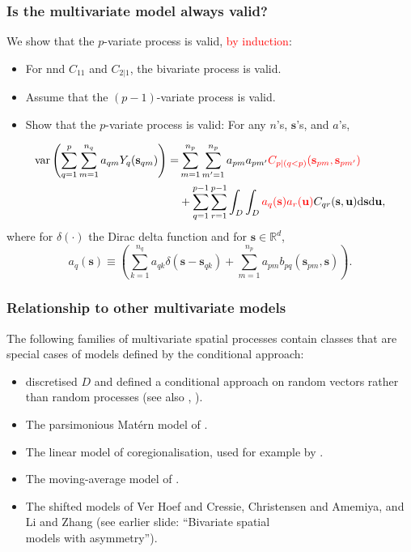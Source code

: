 \documentclass{beamer}
\newcommand{\intd} {\mathrm{d}}
\newcommand{\svec} {\textbf{s}}
\newcommand{\uvec} {\textbf{u}}
\newcommand{\s}{\mathbf{s}}
\newcommand{\var}{\mathrm{var}}
\newcommand{\red}{\textcolor{red}}%
\begin{document}

\begin{frame}
\frametitle{Is the multivariate model always valid?}

We show that the $p$-variate process is valid, \textcolor{red}{by induction}:
\begin{itemize}
  \item For nnd $C_{11}$ and $C_{2|1}$, the bivariate process is valid.
  \item Assume that the $(p-1)$-variate process is valid.
  \item Show that the $p$-variate process is valid: For any $n$'s, $\s$'s, and $a$'s,
\end{itemize}

\vspace{-0.3in}
\begin{align*}
\var\left(\sum_{q=1}^p \sum_{m=1}^{n_q} a_{qm}Y_q(\svec_{qm})\right)=& \sum_{m=1}^{n_p}\sum_{m'=1}^{n_p}a_{pm}a_{pm'}\textcolor{red}{C_{p \mid  (q < p)}(\svec_{pm},\svec_{pm'})} \\
&+ \sum_{q=1}^{p-1}\sum_{r=1}^{p-1}\int_D\int_D\red{a_q(\svec)a_r(\uvec)}C_{qr}(\svec,\uvec)\intd \svec \intd \uvec,
\end{align*}
where for $\delta(\cdot)$ the Dirac delta function and for $\s\in\mathbb{R}^d$,
\begin{equation*}
a_q(\svec) \equiv \left(\sum_{k=1}^{n_q}a_{qk}\delta(\svec - \svec_{qk}) + \sum_{m=1}^{n_p}a_{pm}b_{pq}(\svec_{pm},\svec)\right).
\end{equation*}
\end{frame}


\begin{frame}
\frametitle{Relationship to other multivariate models}
\vspace{-1cm}
The following families of multivariate spatial processes contain classes that are special cases of models defined by the conditional approach:

\begin{itemize}
\item \cite{RoyleBerliner1999} discretised $D$ and defined a conditional approach on random vectors rather than random processes (see also \citeauthor{CressieWikle2011}, \citeyear{CressieWikle2011}).
\item The parsimonious Mat{\'e}rn model of \cite{Gneitingetal2010}.\vfil
\item The linear model of coregionalisation, used for example by \cite{Wackernagel1995}.\vfil
\item The moving-average model of \cite{verHoef_1998}.\vfil
\item The shifted models of Ver Hoef and Cressie, Christensen and Amemiya, and Li and Zhang (see earlier slide: ``Bivariate spatial \\models with asymmetry'').
\end{itemize}
\vfill
\end{frame}
\end{document}
